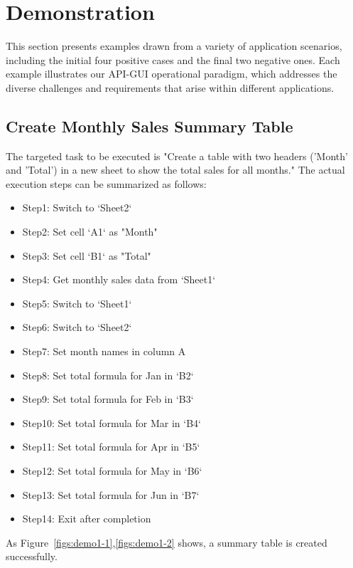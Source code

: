 \section{Demonstration}\label{apdx:demo}
This section presents examples drawn from a variety of application scenarios, including the initial four positive cases and the final two negative ones. Each example illustrates our API-GUI operational paradigm, which addresses the diverse challenges and requirements that arise within different applications.

\subsection{Create Monthly Sales Summary Table}
The targeted task to be executed is "Create a table with two headers ('Month' and 'Total') in a new sheet to show the total sales for all months." The actual execution steps can be summarized as follows:
\begin{itemize}
    \item Step1: Switch to `Sheet2`
    \item Step2: Set cell `A1` as "Month"
    \item Step3: Set cell `B1` as "Total"
    \item Step4: Get monthly sales data from `Sheet1`
    \item Step5: Switch to `Sheet1`
    \item Step6: Switch to `Sheet2`
    \item Step7: Set month names in column A
    \item Step8: Set total formula for Jan in `B2`
    \item Step9: Set total formula for Feb in `B3`
    \item Step10: Set total formula for Mar in `B4`
    \item Step11: Set total formula for Apr in `B5`
    \item Step12: Set total formula for May in `B6`
    \item Step13: Set total formula for Jun in `B7`
    \item Step14: Exit after completion
\end{itemize}
As Figure~\ref{figs:demo1-1},\ref{figs:demo1-2} shows, a summary table is created successfully.

